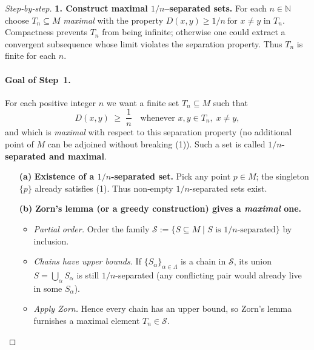 \documentclass[12pt]{article}
\theoremstyle{definition} %
\theoremstyle{plain} %
\begin{document}
\begin{proof}[Step‑by‑step]
  \textbf{1.  Construct maximal $1/n$–separated sets.}  
  For each $n\in\mathbb N$ choose $T_n\subseteq M$ \emph{maximal} with
  the property
  \(
      D(x,y)\ge 1/n\ \text{for }x\ne y\text{ in }T_n.
  \)
  Compactness prevents $T_n$ from being infinite; otherwise one could
  extract a convergent subsequence whose limit violates the separation
  property.  Thus $T_n$ is finite for each $n$.
\paragraph{Goal of Step 1.}
For each positive integer \(n\) we want a finite set
\(T_n\subseteq M\) such that
\[
    D(x,y)\;\ge\;\frac1n
    \quad\text{whenever }x,y\in T_n,\;x\ne y,
    \tag{1}
\]
and which is \emph{maximal} with respect to this separation property
(no additional point of \(M\) can be adjoined without breaking (1)).
Such a set is called \textbf{\(1/n\)-separated and maximal}.

\bigskip
\begin{enumerate}
\item[\textbf{(a)}] \textbf{Existence of a \(1/n\)-separated set.}
      Pick any point \(p\in M\); the singleton \(\{p\}\) already satisfies
      (1).  Thus non‑empty \(1/n\)-separated sets exist.

\item[\textbf{(b)}] \textbf{Zorn’s lemma (or a greedy construction) gives a \emph{maximal} one.}

      \begin{itemize}
          \item \emph{Partial order.}
                Order the family
                \(\mathcal S:=\{S\subseteq M\mid S \text{ is }1/n\text{-separated}\}\)
                by inclusion.
          \item \emph{Chains have upper bounds.}
                If \(\{S_\alpha\}_{\alpha\in\Lambda}\)
                is a chain in \(\mathcal S\),
                its union \(S=\bigcup_{\alpha}S_\alpha\)
                is still \(1/n\)-separated (any conflicting pair would
                already live in some \(S_\alpha\)).
          \item \emph{Apply Zorn.}
                Hence every chain has an upper bound,
                so Zorn’s lemma furnishes a maximal element
                \(T_n\in\mathcal S\).
      \end{itemize}


\end{enumerate}
\end{proof}
\end{document}
